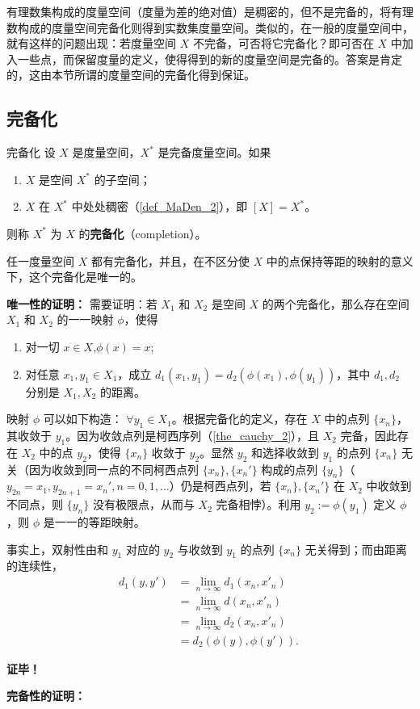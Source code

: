 有理数集构成的度量空间（度量为差的绝对值）是稠密的，但不是完备的，将有理数构成的度量空间完备化则得到实数集度量空间。类似的，在一般的度量空间中，就有这样的问题出现：若度量空间 $X$ 不完备，可否将它完备化？即可否在 $X$ 中加入一些点，而保留度量的定义，使得得到的新的度量空间是完备的。答案是肯定的，这由本节所谓的度量空间的完备化得到保证。

\subsection{完备化}
\begin{definition}{完备化}
设 $X$ 是度量空间，$X^*$ 是完备度量空间。如果
\begin{enumerate}
\item $X$ 是空间 $X^*$ 的子空间；
\item $X$ 在 $X^*$ 中处处稠密（\autoref{def_MaDen_2}），即 $[X]=X^*$。
\end{enumerate}
则称 $X^*$ 为 $X$ 的\textbf{完备化}（completion）。
\end{definition}

\begin{theorem}{}
任一度量空间 $X$ 都有完备化，并且，在不区分使 $X$ 中的点保持等距的映射的意义下，这个完备化是唯一的。
\end{theorem}

\textbf{唯一性的证明：}
需要证明：若 $X_1$ 和 $X_2$ 是空间 $X$ 的两个完备化，那么存在空间 $X_1$ 和 $X_2$ 的一一映射 $\phi$，使得
\begin{enumerate}
\item 对一切 $x\in X$,$\phi(x)=x$;
\item 对任意 $x_1,y_1\in X_1$，成立 $d_1(x_1,y_1)=d_2(\phi(x_1),\phi(y_1))$，其中 $d_1,d_2$ 分别是 $X_1,X_2$ 的距离。
\end{enumerate}
映射 $\phi$ 可以如下构造： $\forall y_1\in X_1$。根据完备化的定义，存在 $X$ 中的点列 $\{x_n\}$，其收敛于 $y_1$。因为收敛点列是柯西序列（\autoref{the_cauchy_2}），且 $X_2$ 完备，因此存在 $X_2$ 中的点 $y_2$，使得 $\{x_n\}$ 收敛于 $y_2$。显然 $y_2$ 和选择收敛到 $y_1$ 的点列 $\{x_n\}$ 无关（因为收敛到同一点的不同柯西点列 $\{x_n\},\{x_n'\}$ 构成的点列 $\{y_n\}$（$y_{2n}=x_1,y_{2n+1}=x_n',n=0,1,\ldots$）仍是柯西点列，若 $\{x_n\},\{x_n'\}$ 在 $X_2$ 中收敛到不同点，则 $\{y_n\}$ 没有极限点，从而与 $X_2$ 完备相悖）。利用 $y_2:=\phi(y_1)$ 定义 $\phi$，则 $\phi$ 是一一的等距映射。

事实上，双射性由和 $y_1$ 对应的 $y_2$ 与收敛到 $y_1$ 的点列 $\{x_n\}$ 无关得到；而由距离的连续性，
\begin{equation}
\begin{aligned}
d_1(y,y')&=\lim_{n\rightarrow\infty} d_1(x_n,x'_n)\\
&=\lim_{n\rightarrow\infty} d(x_n,x'_n)\\
&=\lim_{n\rightarrow\infty} d_2(x_n,x'_n)\\
&=d_2(\phi(y),\phi(y')).
\end{aligned}~
\end{equation}

\textbf{证毕！}

\textbf{完备性的证明：}